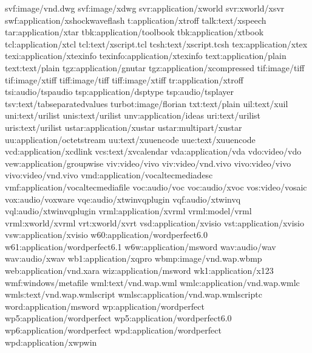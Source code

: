\documentclass[letterpaper,12pt,english]{sphinxmanual}
\begin{document}
\begin{sphinxVerbatim}[commandchars=\\\{\}]
svf:image/vnd.dwg
\PYGZsh{}svf:image/x\PYGZhy{}dwg
svr:application/x\PYGZhy{}world
\PYGZsh{}svr:x\PYGZhy{}world/x\PYGZhy{}svr
swf:application/x\PYGZhy{}shockwave\PYGZhy{}flash
t:application/x\PYGZhy{}troff
talk:text/x\PYGZhy{}speech
tar:application/x\PYGZhy{}tar
tbk:application/toolbook
\PYGZsh{}tbk:application/x\PYGZhy{}tbook
tcl:application/x\PYGZhy{}tcl
\PYGZsh{}tcl:text/x\PYGZhy{}script.tcl
tcsh:text/x\PYGZhy{}script.tcsh
tex:application/x\PYGZhy{}tex
texi:application/x\PYGZhy{}texinfo
texinfo:application/x\PYGZhy{}texinfo
\PYGZsh{}text:application/plain
text:text/plain
\PYGZsh{}tgz:application/gnutar
tgz:application/x\PYGZhy{}compressed
tif:image/tiff
\PYGZsh{}tif:image/x\PYGZhy{}tiff
tiff:image/tiff
\PYGZsh{}tiff:image/x\PYGZhy{}tiff
tr:application/x\PYGZhy{}troff
tsi:audio/tsp\PYGZhy{}audio
tsp:application/dsptype
\PYGZsh{}tsp:audio/tsplayer
tsv:text/tab\PYGZhy{}separated\PYGZhy{}values
turbot:image/florian
txt:text/plain
uil:text/x\PYGZhy{}uil
uni:text/uri\PYGZhy{}list
unis:text/uri\PYGZhy{}list
unv:application/i\PYGZhy{}deas
uri:text/uri\PYGZhy{}list
uris:text/uri\PYGZhy{}list
ustar:application/x\PYGZhy{}ustar
\PYGZsh{}ustar:multipart/x\PYGZhy{}ustar
uu:application/octet\PYGZhy{}stream
\PYGZsh{}uu:text/x\PYGZhy{}uuencode
uue:text/x\PYGZhy{}uuencode
vcd:application/x\PYGZhy{}cdlink
vcs:text/x\PYGZhy{}vcalendar
vda:application/vda
vdo:video/vdo
vew:application/groupwise
viv:video/vivo
\PYGZsh{}viv:video/vnd.vivo
vivo:video/vivo
\PYGZsh{}vivo:video/vnd.vivo
vmd:application/vocaltec\PYGZhy{}media\PYGZhy{}desc
vmf:application/vocaltec\PYGZhy{}media\PYGZhy{}file
voc:audio/voc
\PYGZsh{}voc:audio/x\PYGZhy{}voc
vos:video/vosaic
vox:audio/voxware
vqe:audio/x\PYGZhy{}twinvq\PYGZhy{}plugin
vqf:audio/x\PYGZhy{}twinvq
vql:audio/x\PYGZhy{}twinvq\PYGZhy{}plugin
vrml:application/x\PYGZhy{}vrml
\PYGZsh{}vrml:model/vrml
\PYGZsh{}vrml:x\PYGZhy{}world/x\PYGZhy{}vrml
vrt:x\PYGZhy{}world/x\PYGZhy{}vrt
vsd:application/x\PYGZhy{}visio
vst:application/x\PYGZhy{}visio
vsw:application/x\PYGZhy{}visio
w60:application/wordperfect6.0
w61:application/wordperfect6.1
w6w:application/msword
wav:audio/wav
\PYGZsh{}wav:audio/x\PYGZhy{}wav
wb1:application/x\PYGZhy{}qpro
wbmp:image/vnd.wap.wbmp
web:application/vnd.xara
wiz:application/msword
wk1:application/x\PYGZhy{}123
wmf:windows/metafile
wml:text/vnd.wap.wml
wmlc:application/vnd.wap.wmlc
wmls:text/vnd.wap.wmlscript
wmlsc:application/vnd.wap.wmlscriptc
word:application/msword
wp:application/wordperfect
wp5:application/wordperfect
\PYGZsh{}wp5:application/wordperfect6.0
wp6:application/wordperfect
wpd:application/wordperfect
\PYGZsh{}wpd:application/x\PYGZhy{}wpwin

\end{sphinxVerbatim}
\end{document}
